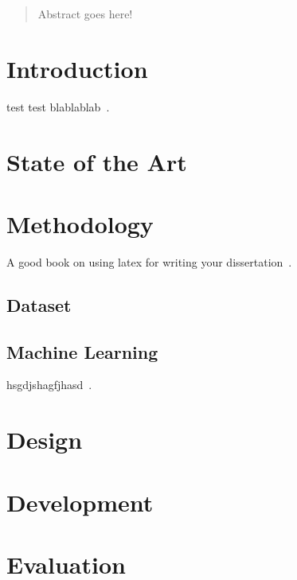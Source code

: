 \documentclass[11pt, a4paper]{report}
\begin{document}

\begin{abstract}
    Abstract goes here!
\end{abstract}

\tableofcontents
{}
\listoffigures
\listoftables
 
\newpage
 

\chapter{Introduction}

test test blablablab~\cite{Costa-Abreu:2019}.

\blindtext

\chapter{State of the Art}

\blindtext

\chapter{Methodology}

A good book on using latex for writing your dissertation~\cite{talbot2013}.

\blindtext[2]

\section{Dataset}

\section{Machine Learning}


hsgdjshagfjhasd~\cite{Costa-Abreu:2019}.

\chapter{Design}


\chapter{Development}


\chapter{Evaluation}
\end{document}
